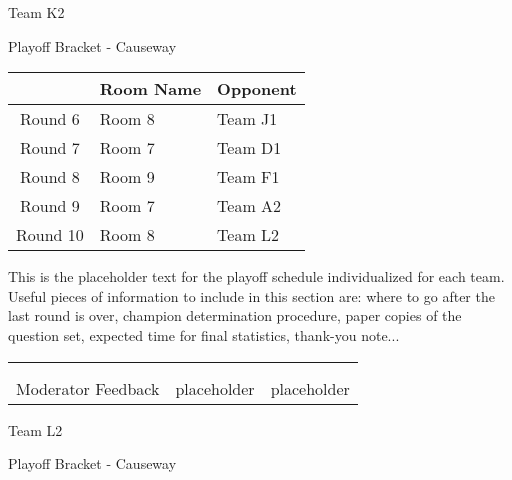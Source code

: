 \documentclass{article}%
\begin{document}
\newpage%
\begin{center}%
\begin{Huge}%
Team K2%
\end{Huge}%
\vspace*{12pt}%
\linebreak%
\begin{Large}%
Playoff Bracket {-} Causeway%
\end{Large}%
\end{center}%
\vspace*{4pt}%
%
\begin{tabularx}{\textwidth}{|c|Y|Y|}%
\hline%
&Room Name&Opponent\\%
\hline%
Round 6&Room 8&Team J1\\%
Round 7&Room 7&Team D1\\%
Round 8&Room 9&Team F1\\%
Round 9&Room 7&Team A2\\%
Round 10&Room 8&Team L2\\%
\hline%
\end{tabularx}%
\vspace*{30pt}%
\linebreak%
This is the placeholder text for the playoff schedule individualized for each team. Useful pieces of information to include in this section are: where to go after the last round is over, champion determination procedure, paper copies of the question set, expected time for final statistics, thank{-}you note...%
\vspace*{30pt}%
\newline%
%
\begin{tabularx}{\textwidth}{YYY}%
  &  &  \\%
\\%
Moderator Feedback&placeholder&placeholder\\%
\end{tabularx}%
\newpage%
\begin{center}%
\begin{Huge}%
Team L2%
\end{Huge}%
\vspace*{12pt}%
\linebreak%
\begin{Large}%
Playoff Bracket {-} Causeway%
\end{Large}%
\end{center}%
\end{document}
